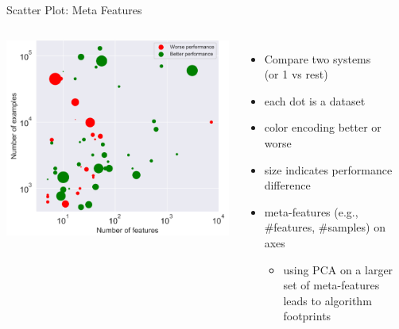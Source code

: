 \begin{frame}[c]{Scatter Plot: Meta Features}

\begin{columns}
	
	\centering
	\includegraphics[width=1.0\textwidth]{images/scatter_dataset_twoconfigs.png}
	
	\begin{itemize}
		\item Compare two systems\\ (or 1 vs rest)
		\item each dot is a dataset
		\item color encoding better or worse
		\item size indicates performance difference
		\item meta-features (e.g., \#features, \#samples) on axes
		\begin{itemize}
			\item using PCA on a larger set of meta-features leads to algorithm footprints 
		\end{itemize}
	\end{itemize}
\end{columns}


\end{frame}
